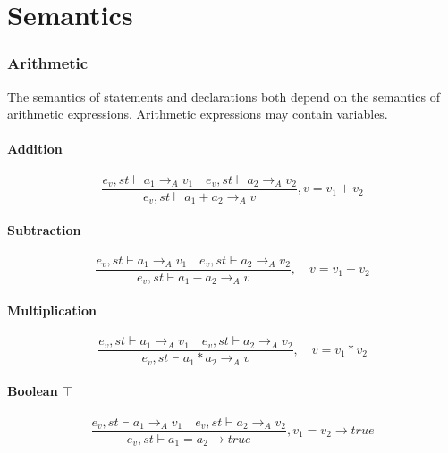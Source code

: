 \chapter{Semantics}
\subsection*{Arithmetic}
The semantics of statements and declarations both depend on the semantics of arithmetic expressions.
Arithmetic expressions may contain variables.

\subsubsection{Addition}
\begin{equation}
	\frac { { e }_{ v },st\vdash { a }_{ 1 }{ \rightarrow  }_{ A }{ v }_{ 1 }\quad { e }_{ v },st\vdash { a }_{ 2 }{ \rightarrow  }_{ A }{ v }_{ 2 } }{ { e }_{ v },st\vdash { a }_{ 1 }+{ a }_{ 2 }{ \rightarrow  }_{ A }{ v } } , v = { v }_{ 1 }+{ v }_{ 2 }
\end{equation}


\subsubsection{Subtraction}
\begin{equation}
	\frac { { e }_{ v },st\vdash { a }_{ 1 }{ \rightarrow  }_{ A }{ v }_{ 1 }\quad { e }_{ v },st\vdash { a }_{ 2 }{ \rightarrow  }_{ A }{ v }_{ 2 } }{ { e }_{ v },st\vdash { a }_{ 1 }-{ a }_{ 2 }{ \rightarrow  }_{ A }{ v } } ,\quad v={ v }_{ 1 }-{ v }_{ 2 }
\end{equation}


\subsubsection{Multiplication}
\begin{equation}
	\frac { { e }_{ v },st\vdash { a }_{ 1 }{ \rightarrow  }_{ A }{ v }_{ 1 }\quad { e }_{ v },st\vdash { a }_{ 2 }{ \rightarrow  }_{ A }{ v }_{ 2 } }{ { e }_{ v },st\vdash { a }_{ 1 }\ast { a }_{ 2 }{ \rightarrow  }_{ A }{ v } } ,\quad v={ v }_{ 1 }\ast { v }_{ 2 }
\end{equation}


\subsubsection{Boolean $\top$}
\begin{equation}
	\frac { { e }_{ v },st\vdash { a }_{ 1 }{ \rightarrow  }_{ A }{ v }_{ 1 }\quad { e }_{ v },st\vdash { a }_{ 2 }{ \rightarrow  }_{ A }{ v }_{ 2 } }{ { e }_{ v },st\vdash { a }_{ 1 }={ a }_{ 2 }{ \rightarrow  }true } ,{ v }_{ 1 }={ v }_{ 2 }\rightarrow true
\end{equation}


